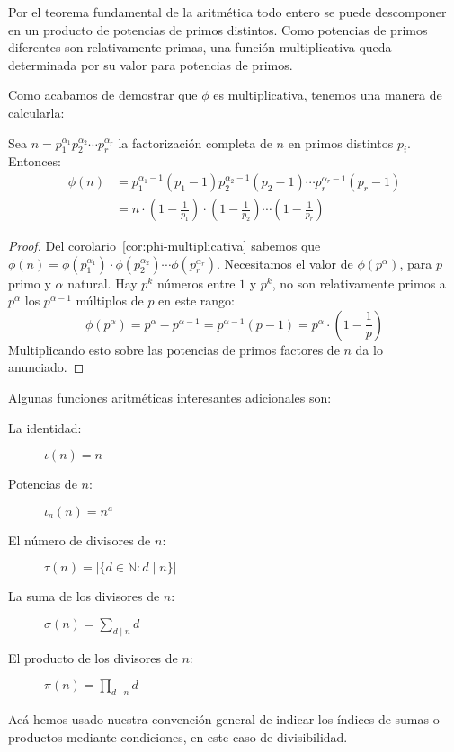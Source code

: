   Por el teorema fundamental de la aritmética%
  todo entero se puede descomponer
  en un producto de potencias de primos distintos.
  Como potencias de primos diferentes son relativamente primas,
  una función multiplicativa queda determinada por su valor
  para potencias de primos.

  Como acabamos de demostrar que \(\phi\) es multiplicativa,
  tenemos una manera de calcularla:
  \begin{corollary}
    \label{cor:calcular-phi}
    Sea \(n = p_1^{\alpha_1} p_2^{\alpha_2} \dotsm p_r^{\alpha_r}\)
    la factorización completa de \(n\) en primos distintos \(p_i\).
    Entonces:
    \begin{align*}
      \phi(n)
	&= p_1^{\alpha_1 - 1} (p_1 - 1) p_2^{\alpha_2 - 1} (p_2 - 1)
	     \dotsm p_r^{\alpha_r - 1} (p_r - 1) \\
	&= n \cdot \left(1 - \frac{1}{p_1}\right) \cdot
		     \left(1 - \frac{1}{p_2}\right) \dotsm
		     \left(1 - \frac{1}{p_r}\right)
    \end{align*}
  \end{corollary}
  \begin{proof}
    Del corolario~\ref{cor:phi-multiplicativa} sabemos que
      \(\phi(n)
	  = \phi(p_1^{\alpha_1}) \cdot \phi(p_2^{\alpha_2})
	      \dotsm \phi(p_r^{\alpha_r})\).
    Necesitamos el valor de \(\phi(p^\alpha)\),
    para \(p\) primo y \(\alpha\) natural.
    Hay \(p^k\) números entre \(1\) y \(p^k\),
    no son relativamente primos a \(p^\alpha\)
    los \(p^{\alpha - 1}\) múltiplos de \(p\) en este rango:
    \begin{equation*}
      \phi(p^\alpha)
	= p^\alpha - p^{\alpha - 1}
	= p^{\alpha - 1} (p - 1)
	= p^\alpha \cdot \left(1 - \frac{1}{p}\right)
    \end{equation*}
    Multiplicando esto
    sobre las potencias de primos factores de \(n\)
    da lo anunciado.
  \end{proof}
  Algunas funciones aritméticas interesantes adicionales son:
  \begin{description}
  \item[La identidad:]
    \(\iota(n) = n\)
  \item[\boldmath Potencias de \(n\):\unboldmath]
    \(\iota_a(n) = n^a\)
  \item[\boldmath El número de divisores de \(n\):\unboldmath]
    \(\tau(n)
	= \lvert \{ d \in \mathbb{N} \colon d \mid n \} \rvert\)
  \item[\boldmath La suma de los divisores de \(n\):\unboldmath]
    \(\sigma(n)
	= \sum_{d \mid n} d\)
  \item[\boldmath El producto de los divisores de \(n\):\unboldmath]
    \(\pi(n)
	= \prod_{d \mid n} d\)
  \end{description}
  Acá hemos usado nuestra convención general de indicar los índices
  de sumas o productos mediante condiciones,
  en este caso de divisibilidad.

